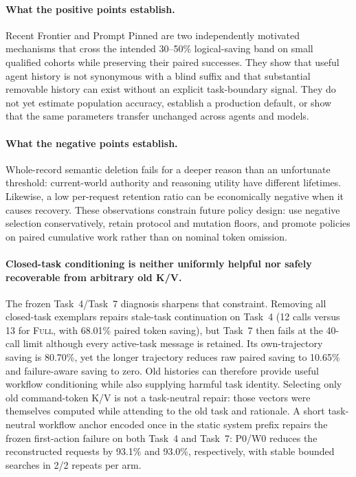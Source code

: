\documentclass[11pt]{article}
\begin{document}
\paragraph{What the positive points establish.}
Recent Frontier and Prompt Pinned are two independently motivated mechanisms
that cross the intended 30--50\% logical-saving band on small qualified
cohorts while preserving their paired successes.  They show that useful agent
history is not synonymous with a blind suffix and that substantial removable
history can exist without an explicit task-boundary signal.  They do not yet
estimate population accuracy, establish a production default, or show that the
same parameters transfer unchanged across agents and models.

\paragraph{What the negative points establish.}
Whole-record semantic deletion fails for a deeper reason than an unfortunate
threshold: current-world authority and reasoning utility have different
lifetimes.  Likewise, a low per-request retention ratio can be economically
negative when it causes recovery.  These observations constrain future policy
design: use negative selection conservatively, retain protocol and mutation
floors, and promote policies on paired cumulative work rather than on nominal
token omission.

\paragraph{Closed-task conditioning is neither uniformly helpful nor safely
recoverable from arbitrary old K/V.}
The frozen Task~4/Task~7 diagnosis sharpens that constraint.  Removing all
closed-task exemplars repairs stale-task continuation on Task~4 (12 calls
versus 13 for \textsc{Full}, with 68.01\% paired token saving), but Task~7
then fails at the 40-call limit although every active-task message is retained.
Its own-trajectory saving is 80.70\%, yet the longer trajectory reduces raw
paired saving to 10.65\% and failure-aware saving to zero.  Old histories can
therefore provide useful workflow conditioning while also supplying harmful
task identity.  Selecting only old command-token K/V is not a task-neutral
repair: those vectors were themselves computed while attending to the old
task and rationale.  A short task-neutral workflow anchor encoded once in the
static system prefix repairs the frozen first-action failure on both Task~4
and Task~7: P0/W0 reduces the reconstructed requests by 93.1\% and 93.0\%,
respectively, with stable bounded searches in 2/2 repeats per arm.
\end{document}
